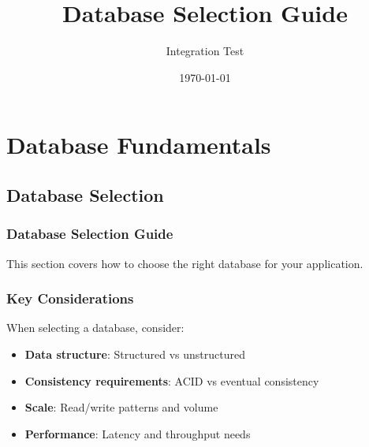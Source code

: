 \documentclass[12pt,a4paper]{book}
\title{Database Selection Guide}
\author{Integration Test}
\date{\today}
\begin{document}
\maketitle

\chapter{Database Fundamentals}

\section{Database Selection}

\subsection{Database Selection Guide}\label{database-selection-guide}

This section covers how to choose the right database for your application.

\subsection{Key Considerations}\label{key-considerations}

When selecting a database, consider:

\begin{itemize}
\tightlist
\item
\textbf{Data structure}: Structured vs unstructured
\item
\textbf{Consistency requirements}: ACID vs eventual consistency
\item
\textbf{Scale}: Read/write patterns and volume
\item
\textbf{Performance}: Latency and throughput needs
\end{itemize}
\end{document}
